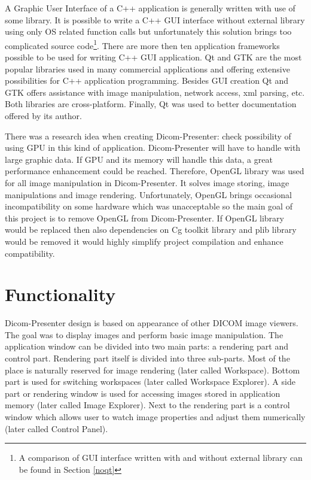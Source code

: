 A Graphic User Interface of a C++ application is generally written with use of some library. It is possible to write a C++ GUI interface without external library using only OS related function calls but unfortunately this solution brings too complicated source code\footnote{A comparison of GUI interface written with and without external library can be found in Section \ref{noqt}}. There are more then ten application frameworks possible to be used for writing C++ GUI application. Qt and GTK are the most popular libraries used in many commercial applications and offering extensive possibilities for C++ application programming\cite{wikipedia}. Besides GUI creation Qt and GTK offers assistance with image manipulation, network access, xml parsing, etc. Both libraries are cross-platform. Finally, Qt was used to better documentation offered by its author.

There was a research idea when creating Dicom-Presenter: check possibility of using GPU in this kind of application. Dicom-Presenter will have to handle with large graphic data. If GPU and its memory will handle this data, a great performance enhancement could be reached. Therefore, OpenGL library was used for all image manipulation in Dicom-Presenter. It solves image storing, image manipulations and image rendering. Unfortunately, OpenGL brings 
occasional incompatibility on some hardware which was unacceptable so the main goal of this project is to remove OpenGL from Dicom-Presenter. If OpenGL library would be replaced then also dependencies on Cg toolkit library and plib library would be removed it would highly simplify project compilation and enhance compatibility.



\section{Functionality}
\label{dicom-presenter}
Dicom-Presenter design is based on appearance of other DICOM image viewers. The goal was to display images and perform basic image manipulation. The application window can be divided into two main parts: a rendering part and control part. Rendering part itself is divided into three sub-parts. Most of the place is naturally reserved for image rendering (later called Workspace). Bottom part is used for switching workspaces (later called Workspace Explorer). A side part or rendering window is used for accessing images stored in application memory (later called Image Explorer). Next to the rendering part is a control window which allows user to watch image  properties and adjust them numerically (later called Control Panel). 

